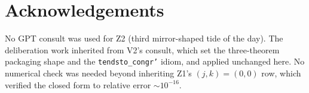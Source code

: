\documentclass[11pt]{article}
\begin{document}
\section*{Acknowledgements}

No GPT consult was used for Z2 (third mirror-shaped tide of the
day). The deliberation work inherited from V2's consult, which set
the three-theorem packaging shape and the \texttt{tendsto\_congr'}
idiom, and applied unchanged here. No numerical check was needed
beyond inheriting Z1's $(j, k) = (0, 0)$ row, which verified the
closed form to relative error ${\sim}10^{-16}$.
\end{document}
